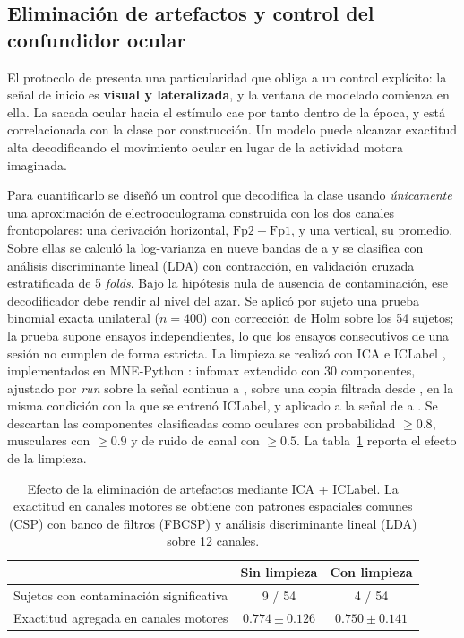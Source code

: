 \subsection{Eliminación de artefactos y control del confundidor ocular}
\label{sec:artefactos}

El protocolo de \openbmi{} presenta una particularidad que obliga a un control
explícito: la señal de inicio es \textbf{visual y lateralizada}, y la ventana de
modelado comienza en ella. La sacada ocular hacia el estímulo cae por tanto
dentro de la época, y está correlacionada con la clase por construcción. Un
modelo puede alcanzar exactitud alta decodificando el movimiento ocular en lugar
de la actividad motora imaginada.

Para cuantificarlo se diseñó un control que decodifica la clase usando
\emph{únicamente} una aproximación de electrooculograma construida con los dos canales
frontopolares: una derivación horizontal, $\mathrm{Fp2}-\mathrm{Fp1}$, y una vertical, su
promedio. Sobre ellas se calculó la log-varianza en nueve bandas de  a  y se
clasifica con análisis discriminante lineal (LDA) con contracción, en validación cruzada estratificada de 5 \textit{folds}. Bajo
la hipótesis nula de ausencia de contaminación, ese decodificador debe rendir al
nivel del azar. Se aplicó por sujeto una prueba binomial exacta unilateral ($n = 400$) con
corrección de Holm \cite{holm1979} sobre los 54 sujetos; la prueba supone ensayos
independientes, lo que los ensayos consecutivos de una sesión no cumplen de forma estricta.
La limpieza se realizó con ICA e ICLabel \cite{pion2019iclabel}, implementados en
MNE-Python \cite{gramfort2013mne}: infomax extendido
con 30 componentes, ajustado por \textit{run} sobre la señal continua a , sobre una
copia filtrada desde , en la misma condición
con la que se entrenó ICLabel, y aplicado a la señal de  a . Se descartan las
componentes clasificadas como oculares con probabilidad $\geq 0.8$, musculares con
$\geq 0.9$ y de ruido de canal con $\geq 0.5$. La tabla~\ref{tab:artefactos} reporta el
efecto de la limpieza.

\begin{table}[htbp]
\centering
\caption{Efecto de la eliminación de artefactos mediante ICA + ICLabel. La exactitud en
canales motores se obtiene con patrones espaciales comunes (CSP) con banco de filtros (FBCSP) y análisis discriminante lineal (LDA) sobre 12 canales.}
\label{tab:artefactos}
\begin{tabular}{lcc}
\toprule
 & \textbf{Sin limpieza} & \textbf{Con limpieza} \\
\midrule
Sujetos con contaminación significativa & 9 / 54 & 4 / 54 \\
Exactitud agregada en canales motores   & $0.774 \pm 0.126$  & $0.750 \pm 0.141$ \\
\bottomrule
\end{tabular}
\end{table}

